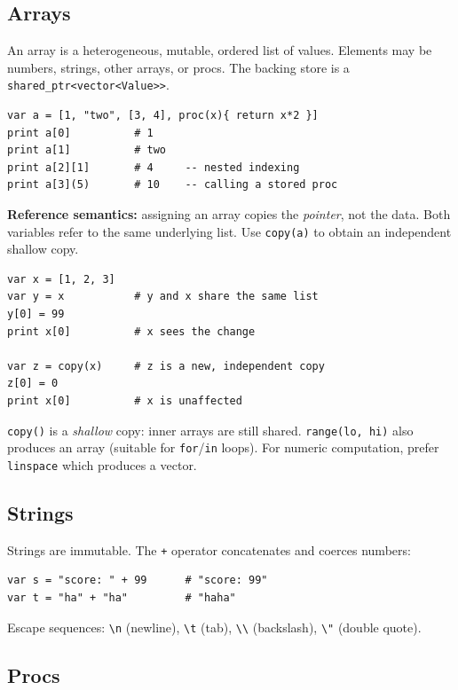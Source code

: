 \documentclass[11pt,a4paper]{article}
\newcommand{\musil}[1]{\lstinline[style=musilinline]{#1}}
\begin{document}
\subsection{Arrays}

An array is a heterogeneous, mutable, ordered list of values. Elements may be
numbers, strings, other arrays, or procs. The backing store is a
\texttt{shared\_ptr<vector<Value>>}.

\begin{lstlisting}
var a = [1, "two", [3, 4], proc(x){ return x*2 }]
print a[0]          # 1
print a[1]          # two
print a[2][1]       # 4     -- nested indexing
print a[3](5)       # 10    -- calling a stored proc
\end{lstlisting}

\textbf{Reference semantics:} assigning an array copies the \emph{pointer}, not
the data. Both variables refer to the same underlying list. Use \musil{copy(a)}
to obtain an independent shallow copy.

\begin{lstlisting}
var x = [1, 2, 3]
var y = x           # y and x share the same list
y[0] = 99
print x[0]          # x sees the change

var z = copy(x)     # z is a new, independent copy
z[0] = 0
print x[0]          # x is unaffected
\end{lstlisting}

\musil{copy()} is a \emph{shallow} copy: inner arrays are still shared.
\musil{range(lo, hi)} also produces an array (suitable for \musil{for}/\musil{in} loops).
For numeric computation, prefer \musil{linspace} which produces a vector.

\subsection{Strings}

Strings are immutable. The \texttt{+} operator concatenates and coerces numbers:

\begin{lstlisting}
var s = "score: " + 99      # "score: 99"
var t = "ha" + "ha"         # "haha"
\end{lstlisting}

Escape sequences: \texttt{\textbackslash n} (newline), \texttt{\textbackslash t}
(tab), \texttt{\textbackslash\textbackslash} (backslash), \texttt{\textbackslash"}
(double quote).

\subsection{Procs}
\end{document}
